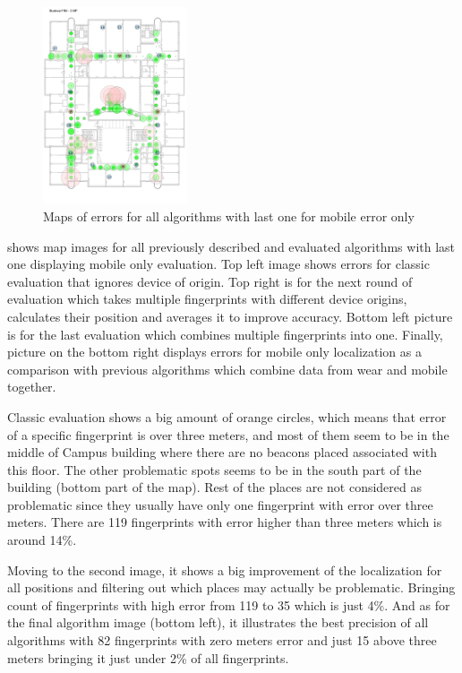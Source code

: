 \begin{figure}[h!]
\begin{centering}
		\hspace{0.3cm}
		\includegraphics[width=0.38\textwidth]{img/phone_error}
		\par\end{centering}
	\caption{Maps of errors for all algorithms with last one for mobile error only}
	\label{fig09c06}
\end{figure}

 shows map images for all previously described and evaluated algorithms with last one displaying mobile only evaluation. Top left image shows errors for classic evaluation that ignores device of origin. Top right is for the next round of evaluation which takes multiple fingerprints with different device origins, calculates their position and averages it to improve accuracy. Bottom left picture is for the last evaluation which combines multiple fingerprints into one. Finally, picture on the bottom right displays errors for mobile only localization as a comparison with previous algorithms which combine data from wear and mobile together.  

Classic evaluation shows a big amount of orange circles, which means that error of a specific fingerprint is over three meters, and most of them seem to be in the middle of Campus building where there are no beacons placed associated with this floor. The other problematic spots seems to be in the south part of the building (bottom part of the map). Rest of the places are not considered as problematic since they usually have only one fingerprint with error over three meters. There are 119 fingerprints with error higher than three meters which is around 14\%.

Moving to the second image, it shows a big improvement of the localization for all positions and filtering out which places may actually be problematic. Bringing count of fingerprints with high error from 119 to 35 which is just 4\%. And as for the final algorithm image (bottom left), it illustrates the best precision of all algorithms with 82 fingerprints with zero meters error and just 15 above three meters bringing it just under 2\% of all fingerprints.